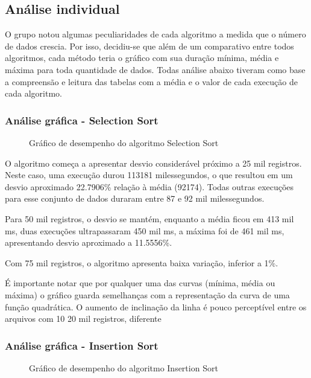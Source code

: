 \documentclass[a4paper,12pt]{scrartcl}
\begin{document}
\subsection{Análise individual}

O grupo notou algumas peculiaridades de cada algoritmo a medida que o número de dados crescia. Por isso, decidiu-se que além de um comparativo entre todos algoritmos, cada método teria o gráfico com sua duração mínima, média e máxima para toda quantidade de dados. Todas análise abaixo tiveram como base a compreensão e leitura das tabelas com a média e o valor de cada execução de cada algoritmo.

\subsubsection{Análise gráfica - Selection Sort}

\begin{figure}[H]
    \centering
    
    \caption{Gráfico de desempenho do algoritmo Selection Sort}
    \label{mapaSelect}
\end{figure}

O algoritmo começa a apresentar desvio considerável próximo a 25 mil registros. Neste caso, uma execução durou 113181 milessegundos, o que resultou em um desvio aproximado 22.7906\% relação à média (92174). Todas outras execuções para esse conjunto de dados duraram entre 87 e 92 mil milessegundos.

Para 50 mil registros, o desvio se mantém, enquanto a média ficou em 413 mil ms, duas execuções ultrapassaram 450 mil ms, a máxima foi de 461 mil ms, apresentando desvio aproximado a 11.5556\%. 

Com 75 mil registros, o algoritmo apresenta baixa variação, inferior a 1\%.

É importante notar que por qualquer uma das curvas (mínima, média ou máxima) o gráfico guarda semelhanças com a representação da curva de uma função quadrática. O aumento de inclinação da linha é pouco perceptível entre os arquivos com 10 20 mil registros, diferente 

\subsubsection{Análise gráfica - Insertion Sort}

\begin{figure}[H]
    \centering
    
    \caption{Gráfico de desempenho do algoritmo Insertion Sort}
    \label{mapaSelect}
\end{figure}
\end{document}

